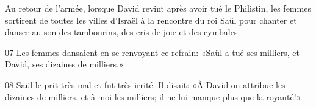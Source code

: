 Au retour de l’armée, lorsque David revint après avoir tué le Philistin, les femmes sortirent de toutes les villes d’Israël à la rencontre du roi Saül pour chanter et danser au son des tambourins, des cris de joie et des cymbales.

07 Les femmes dansaient en se renvoyant ce refrain: «Saül a tué ses milliers, et David, ses dizaines de milliers.»

08 Saül le prit très mal et fut très irrité. Il disait: «À David on attribue les dizaines de milliers, et à moi les milliers; il ne lui manque plus que la royauté!»

